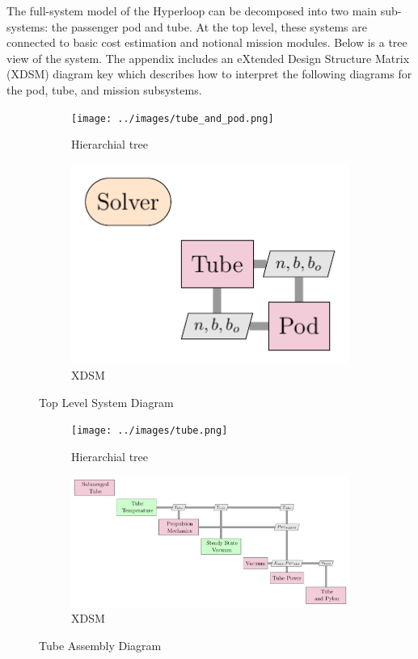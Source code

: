 The full-system model of the Hyperloop can be decomposed into two main
sub-systems: the passenger pod and tube. At the top level, these systems are
connected to basic cost estimation and notional
mission modules. Below is a tree view of the system.
The appendix includes an eXtended Design Structure Matrix (XDSM) diagram key
which describes how to interpret the following diagrams for the pod, tube, and mission subsystems.

\begin{figure}
\centering
\begin{subfigure}{.5\textwidth}
  \centering
  \texttt{[image: ../images/tube\_and\_pod.png]}
  \caption{Hierarchial tree}
  \label{fig:tree:tube_and_pod}
\end{subfigure}%
\begin{subfigure}{.5\textwidth}
  \centering
  \includegraphics{../images/xdsm/tube_and_pod.pdf}
  \caption{XDSM}
  \label{fig:xdsm:toplevel}
\end{subfigure}
\caption{Top Level System Diagram}
\label{fig:top}
\end{figure}

\begin{figure}
\centering
\begin{subfigure}{.5\textwidth}
  \centering
  \texttt{[image: ../images/tube.png]}
  \caption{Hierarchial tree}
  \label{fig:tree:tube}
\end{subfigure}%
\begin{subfigure}{.5\textwidth}
  \centering
  \includegraphics{../images/xdsm/tube.pdf}
  \caption{XDSM}
  \label{fig:xdsm:tube}
\end{subfigure}
\caption{Tube Assembly Diagram}
\label{fig:tube}
\end{figure}


